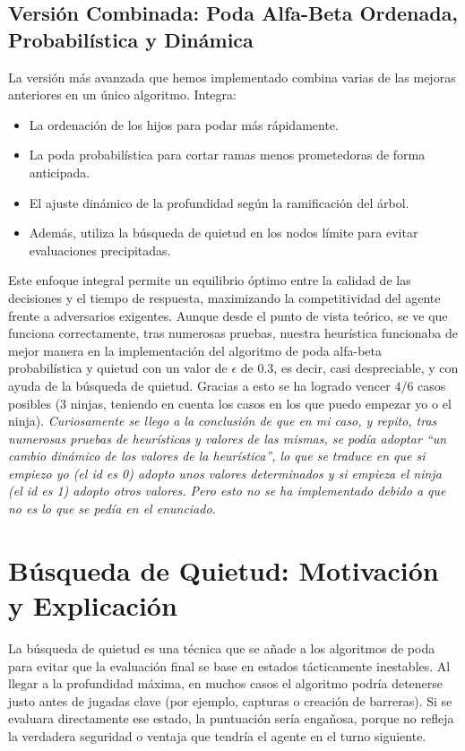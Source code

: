 \section*{Versión Combinada: Poda Alfa-Beta Ordenada, Probabilística y Dinámica}
La versión más avanzada que hemos implementado combina varias de las mejoras anteriores en un único algoritmo. Integra:
\begin{itemize}
    \item La ordenación de los hijos para podar más rápidamente.
    \item La poda probabilística para cortar ramas menos prometedoras de forma anticipada.
    \item El ajuste dinámico de la profundidad según la ramificación del árbol.
    \item Además, utiliza la búsqueda de quietud en los nodos límite para evitar evaluaciones precipitadas.
\end{itemize}
Este enfoque integral permite un equilibrio óptimo entre la calidad de las decisiones y el tiempo de respuesta, maximizando la competitividad del agente frente a adversarios exigentes.
Aunque desde el punto de vista teórico, se ve que funciona correctamente, tras numerosas pruebas, nuestra heurística funcionaba de mejor manera en la implementación del algoritmo de poda alfa-beta probabilística y quietud con un valor de $\epsilon$ de 0.3, es decir, casi despreciable, y con ayuda de la búsqueda de quietud. Gracias a esto se ha logrado vencer $4/6$ casos posibles (3 ninjas, teniendo en cuenta los casos en los que puedo empezar yo o el ninja). \textit{Curiosamente se llego a la conclusión de que en mi caso, y repito, tras numerosas pruebas de heurísticas y valores de las mismas, se podía adoptar ``un cambio dinámico de los valores de la heurística'', lo que se traduce en que si empiezo yo (el id es 0) adopto unos valores determinados y si empieza el ninja (el id es 1) adopto otros valores. Pero esto no se ha implementado debido a que no es lo que se pedía en el enunciado.} 



\chapter*{Búsqueda de Quietud: Motivación y Explicación}

La búsqueda de quietud es una técnica que se añade a los algoritmos de poda para evitar que la evaluación final se base en estados tácticamente inestables. Al llegar a la profundidad máxima, en muchos casos el algoritmo podría detenerse justo antes de jugadas clave (por ejemplo, capturas o creación de barreras). Si se evaluara directamente ese estado, la puntuación sería engañosa, porque no refleja la verdadera seguridad o ventaja que tendría el agente en el turno siguiente.

